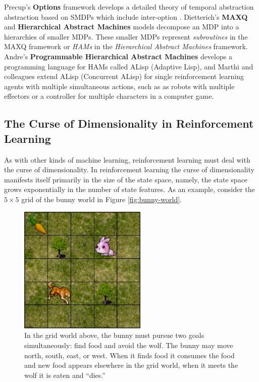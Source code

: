 Precup's {\bf Options} \cite{precup1998a-theoretical,sutton1999between,precup2000a-temporal} framework develops a detailed theory of temporal abstraction abstraction based on SMDPs which include inter-option . Dietterich's {\bf MAXQ} \cite{dietterich1998maxq,dietterich2000hierarchical} and {\bf Hierarchical Abstract Machines} \cite{parr1998reinforcement} models decompose an MDP into a hierarchies of smaller MDPs. These smaller MDPs represent {\it subroutines} in the MAXQ framework or {\it HAMs} in the {\it Hierarchical Abstract Machines} framework. Andre's {\bf Programmable Hierarchical Abstract Machines} \cite{andre2000programmable,andre2002state} develops a programming language for HAMs called ALisp (Adaptive Lisp), and Marthi and colleagues  \cite{marthi2005concurrent} extend ALisp (Concurrent ALisp) for single reinforcement learning agents with multiple simultaneous actions, such as as robots with multiple effectors or a controller for multiple characters in a computer game.

\subsection{The Curse of Dimensionality in Reinforcement Learning}\label{sec:curse-dimensinality}

As with other kinds of machine learning, reinforcement learning must deal with the curse of dimensionality. In reinforcement learning the curse of dimensionality manifests itself primarily in the size of the state space, namely, the state space grows exponentially in the number of state features. As an example, consider the $5 \times 5$ grid of the bunny world in Figure \ref{fig:bunny-world}.

\begin{figure}[h]

\begin{center}
\includegraphics[height=2.4in]{bunny.png}
\end{center}
\caption{In the grid world above, the bunny must pursue two goals simultaneously: find food and avoid the wolf.  The bunny may move north, south, east, or west.  When it finds food it consumes the food and new food appears elsewhere in the grid world, when it meets the wolf it is eaten and ``dies.''}
\label{fig:bunny-picture}
\end{figure}

